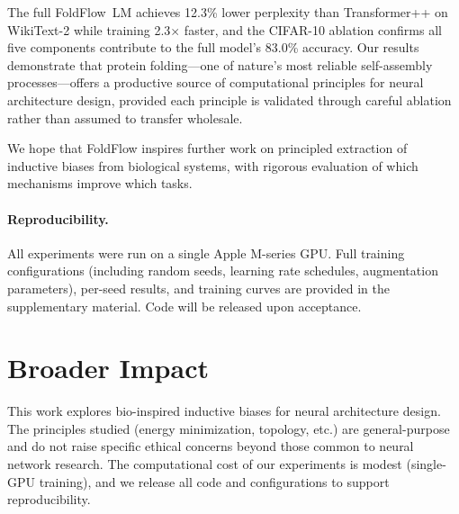 \documentclass[10pt]{article}
\begin{document}
The full FoldFlow~LM achieves 12.3\% lower perplexity than
Transformer++ on WikiText-2 while training 2.3$\times$ faster, and
the CIFAR-10 ablation confirms all five components contribute to the
full model's 83.0\% accuracy.  Our results demonstrate that protein
folding---one of nature's most reliable self-assembly processes---offers
a productive source of computational principles for neural architecture
design, provided each principle is validated through careful ablation
rather than assumed to transfer wholesale.

We hope that FoldFlow inspires further work on principled extraction
of inductive biases from biological systems, with rigorous evaluation
of which mechanisms improve which tasks.

\paragraph{Reproducibility.}
All experiments were run on a single Apple M-series GPU.  Full
training configurations (including random seeds, learning rate
schedules, augmentation parameters), per-seed results, and
training curves are provided in the supplementary material.
Code will be released upon acceptance.

\section*{Broader Impact}
This work explores bio-inspired inductive biases for neural architecture design. The principles studied (energy minimization, topology, etc.) are general-purpose and do not raise specific ethical concerns beyond those common to neural network research. The computational cost of our experiments is modest (single-GPU training), and we release all code and configurations to support reproducibility.


\end{document}
